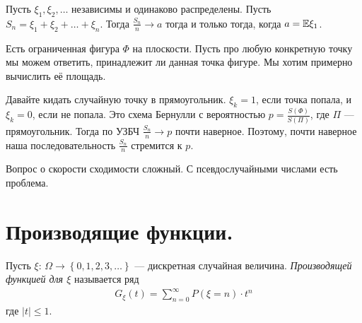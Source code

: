 \documentclass[../main.tex]{subfiles}
\begin{document}
\begin{thm}
 Пусть $ \xi_1, \xi_2, \ldots $  независимы и одинаково распределены. Пусть $ S_n  = \xi_1 + \xi_2 + \ldots + \xi_n $. Тогда $ \frac{S_n}{n} \to a $ тогда и только тогда, когда $ a = \mathbb E \xi_1 $.
\end{thm}

\begin{exmpl}
Есть ограниченная фигура $ \Phi $ на плоскости. Пусть про любую конкретную точку мы можем ответить, принадлежит ли данная точка фигуре. Мы хотим примерно вычислить её площадь.

 Давайте кидать случайную точку в прямоугольник. $ \xi_k = 1 $, если точка попала, и $ \xi_k = 0 $, если не попала. Это схема Бернулли с вероятностью $ p = \frac{S(\Phi)}{S(\Pi)} $, где $ \Pi $ --- прямоугольник. Тогда по УЗБЧ  $ \frac{S_n}{n} \to p $  почти наверное. Поэтому, почти наверное наша последовательность $ \frac{S_n}{n} $ стремится к $ p $.

 Вопрос о скорости сходимости сложный. С псевдослучайными числами есть проблема.
\end{exmpl}

\newpage
\section{Производящие функции.}

\begin{df}
 Пусть $ \xi \colon\, \Omega \to \left\{ 0, 1, 2, 3, \ldots \right\} $ --- дискретная случайная величина. \textit{Производящей функцией для $ \xi $} называется ряд
 \begin{align*}
  G_\xi(t) = \sum_{n=0}^{\infty}P(\xi = n) \cdot t^{n}
 \end{align*} где $ \left| t \right| \leqslant 1 $.
\end{df}
\end{document}
